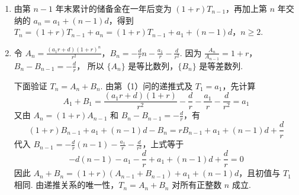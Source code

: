 \begin{solution}
\begin{enumerate}
\item 由第 \(n-1\) 年末累计的储备金在一年后变为 \((1+r)T_{n-1}\)，再加上第 \(n\) 年交纳的 \(a_n=a_1+(n-1)d\)，得到
\(T_n=(1+r)T_{n-1}+a_n=(1+r)T_{n-1}+a_1+(n-1)d\)，\(n\geqslant2\).

\item 令
\(A_n=\frac{(a_1r+d)(1+r)^n}{r^2}\)，\(B_n=-\frac{d}{r}n-\frac{a_1}{r}-\frac{d}{r^2}\).
因为
\(\frac{A_n}{A_{n-1}}=1+r\)，\(B_n-B_{n-1}=-\frac{d}{r}\)，
所以 \(\{A_n\}\) 是等比数列，\(\{B_n\}\) 是等差数列.

下面验证 \(T_n=A_n+B_n\). 由第（1）问的递推式及 \(T_1=a_1\)，先计算
\[
A_1+B_1
=\frac{(a_1r+d)(1+r)}{r^2}
-\frac{d}{r}-\frac{a_1}{r}-\frac{d}{r^2}
=a_1
\]
又由 \(A_n=(1+r)A_{n-1}\) 和 \(B_n-B_{n-1}=-\frac{d}{r}\)，有
\[
(1+r)B_{n-1}+a_1+(n-1)d
-B_n
=rB_{n-1}+a_1+(n-1)d+\frac{d}{r}
\]
代入 \(B_{n-1}=-\frac{d}{r}(n-1)-\frac{a_1}{r}-\frac{d}{r^2}\)，上式等于
\[
-d(n-1)-a_1-\frac{d}{r}+a_1+(n-1)d+\frac{d}{r}=0
\]
因此 \(A_n+B_n=(1+r)(A_{n-1}+B_{n-1})+a_1+(n-1)d\)，且初值与 \(T_1\) 相同. 由递推关系的唯一性，\(T_n=A_n+B_n\) 对所有正整数 \(n\) 成立.
\end{enumerate}
\end{solution}
